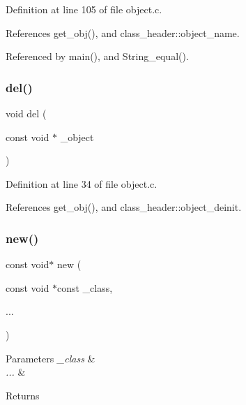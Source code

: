 Definition at line 105 of file object.\+c.



References get\+\_\+obj(), and class\+\_\+header\+::object\+\_\+name.



Referenced by main(), and String\+\_\+equal().

\mbox{\label{group__basic_gae293fe2fbbf9f2e8a87c1141e7412814}} 
\subsubsection{\texorpdfstring{del()}{del()}}
{\footnotesize\ttfamily void del (\begin{DoxyParamCaption}\item[{const void $\ast$}]{\+\_\+object }\end{DoxyParamCaption})}



Definition at line 34 of file object.\+c.



References get\+\_\+obj(), and class\+\_\+header\+::object\+\_\+deinit.

\mbox{\label{group__basic_gaa356efc2c9e72711bf56b41a4f7b125f}} 
\subsubsection{\texorpdfstring{new()}{new()}}
{\footnotesize\ttfamily const void$\ast$ new (\begin{DoxyParamCaption}\item[{const void $\ast$const}]{\+\_\+class,  }\item[{}]{... }\end{DoxyParamCaption})}


\begin{DoxyParams}{Parameters}
{\em \+\_\+class} & \\
\hline
{\em ...} & \\
\hline
\end{DoxyParams}
\begin{DoxyReturn}{Returns}

\end{DoxyReturn}


